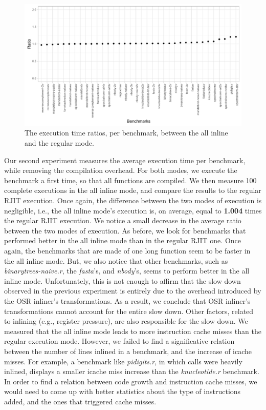 \clearpage
\begin{landscape}
\begin{figure}[h]
    \includegraphics[scale=0.9]{Figures/execReal5}
    \caption{The execution time ratios, per benchmark, between the all inline and the regular mode.}
    \label{fig:execreal5}
\end{figure}
\end{landscape}
\clearpage


Our second experiment measures the average execution time per benchmark, while removing the compilation overhead.
For both modes, we execute the benchmark a first time, so that all functions are compiled. 
We then measure 100 complete executions in the all inline mode, and compare the results to the regular RJIT execution.
Once again, the difference between the two modes of execution is negligible, i.e., the all inline mode's execution is, on average, equal to \textbf{1.004} times the regular RJIT execution.
We notice a small decrease in the average ratio between the two modes of execution.
As before, we look for benchmarks that performed better in the all inline mode than in the regular RJIT one.
Once again, the benchmarks that are made of one long function seem to be faster in the all inline mode.
But, we also notice that other benchmarks, such as \textit{binarytrees-naive.r}, the \textit{fasta}'s, and \textit{nbody}'s, seems to perform better in the all inline mode.
Unfortunately, this is not enough to affirm that the slow down observed in the previous experiment is entirely due to the overhead introduced by the OSR inliner's transformations.
As a result, we conclude that OSR inliner's transformations cannot account for the entire slow down.
Other factors, related to inlining (e.g., register pressure), are also responsible for the slow down.
We measured that the all inline mode leads to more instruction cache misses than the regular execution mode.
However, we failed to find a significative relation between the number of lines inlined in a benchmark, and the increase of icache misses.
For example, a benchmark like \textit{pidigits.r}, in which calls were heavily inlined, displays a smaller icache miss increase than the \textit{knucleotide.r} benchmark.
In order to find a relation between code growth and instruction cache misses, we would need to come up with better statistics about the type of instructions added, and the ones that triggered cache misses.\\

